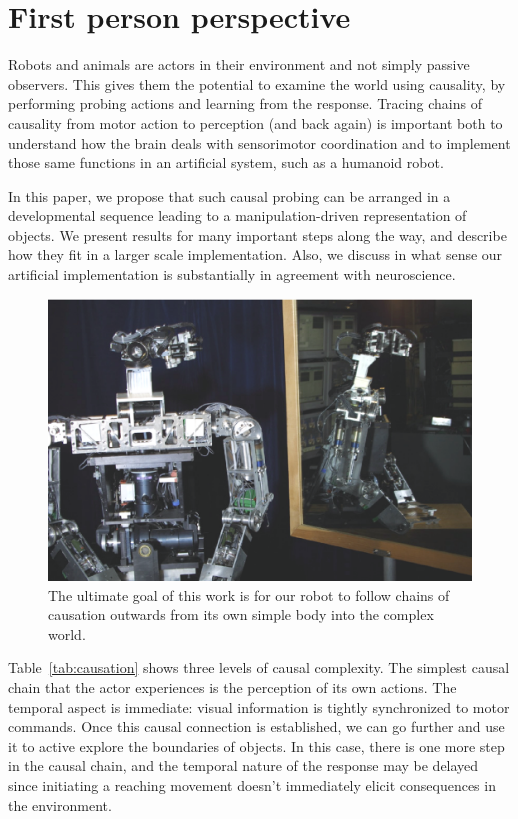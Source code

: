 
\section{First person perspective}

Robots and animals are actors in their environment and not simply passive
observers.  This gives them the potential to examine the world using
causality, by performing probing actions and learning from the
response.  Tracing chains of causality from motor action to perception
(and back again) is important both to understand how the brain deals
with sensorimotor coordination and to implement those same functions
in an artificial system, such as a humanoid robot.

In this paper, we propose that such causal probing can be arranged in
a developmental sequence leading to a manipulation-driven
representation of objects.  We present results for many important steps
along the way, and describe how they fit in a larger scale implementation.
Also, we discuss in what sense our artificial implementation is substantially 
in agreement with neuroscience. 

\begin{figure}[tbh]
\begin{center}
\includegraphics[width=12cm]{mirror-cog.eps}
\caption{ 
\label{fig:mirror-cog}
%
The ultimate goal of this work is for our robot to follow chains of
causation outwards from its own simple body into the complex world.
%
}
\end{center}
\end{figure}


Table~\ref{tab:causation} shows three levels of causal complexity.
The simplest causal chain that the actor experiences is the
perception of its own actions.  The temporal aspect is immediate:
visual information is tightly synchronized to motor commands.
Once this causal connection is established, we can go further and use
it to active explore the boundaries of objects.  In this case, there
is one more step in the causal chain, and the temporal nature of
the response may be delayed since initiating a reaching movement doesn't
immediately elicit consequences in the environment.  


